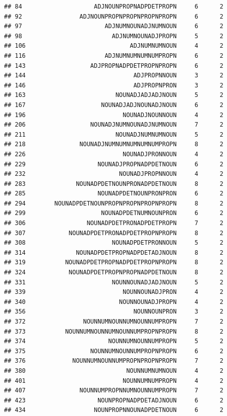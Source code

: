 \documentclass[]{article}
\begin{document}
\begin{verbatim}
## 84                    ADJNOUNPROPNADPDETPROPN     6      2
## 92                ADJNOUNPROPNPROPNPROPNPROPN     6      2
## 97                       ADJNUMNOUNADJNUMNOUN     6      2
## 98                         ADJNUMNOUNADJPROPN     5      2
## 106                             ADJNUMNUMNOUN     4      2
## 116                      ADJNUMNUMNUMNUMPROPN     6      2
## 143                  ADJPROPNADPDETPROPNPROPN     6      2
## 144                              ADJPROPNNOUN     3      2
## 146                              ADJPROPNPRON     3      2
## 163                         NOUNADJADJADJNOUN     5      2
## 167                     NOUNADJADJNOUNADJNOUN     6      2
## 196                           NOUNADJNOUNNOUN     4      2
## 206                  NOUNADJNUMNOUNADJNUMNOUN     7      2
## 211                         NOUNADJNUMNUMNOUN     5      2
## 218               NOUNADJNUMNUMNUMNUMNUMPROPN     8      2
## 226                           NOUNADJPRONNOUN     4      2
## 229                    NOUNADJPROPNADPDETNOUN     6      2
## 232                          NOUNADJPROPNNOUN     4      2
## 283              NOUNADPDETNOUNPRONADPDETNOUN     8      2
## 285                    NOUNADPDETNOUNPRONPRON     6      2
## 294        NOUNADPDETNOUNPROPNPROPNPROPNPROPN     8      2
## 299                     NOUNADPDETNUMNOUNPRON     6      2
## 306                 NOUNADPDETPRONADPDETPROPN     7      2
## 307            NOUNADPDETPRONADPDETPROPNPROPN     8      2
## 308                        NOUNADPDETPRONNOUN     5      2
## 314              NOUNADPDETPROPNADPDETADJNOUN     8      2
## 319           NOUNADPDETPROPNADPDETPROPNPROPN     8      2
## 324            NOUNADPDETPROPNPROPNADPDETNOUN     8      2
## 331                        NOUNNOUNADJADJNOUN     5      2
## 339                           NOUNNOUNADJPRON     4      2
## 340                          NOUNNOUNADJPROPN     4      2
## 356                              NOUNNOUNPRON     3      2
## 372                NOUNNUMNOUNNUMNOUNNUMPROPN     7      2
## 373           NOUNNUMNOUNNUMNOUNNUMPROPNPROPN     8      2
## 374                       NOUNNUMNOUNNUMPROPN     5      2
## 375                  NOUNNUMNOUNNUMPROPNPROPN     6      2
## 376             NOUNNUMNOUNNUMPROPNPROPNPROPN     7      2
## 380                            NOUNNUMNUMNOUN     4      2
## 401                           NOUNNUMNUMPROPN     4      2
## 407               NOUNNUMPROPNNUMNOUNNUMPROPN     7      2
## 423                    NOUNPROPNADPDETADJNOUN     6      2
## 434                   NOUNPROPNNOUNADPDETNOUN     6      2

\end{verbatim}
\end{document}

